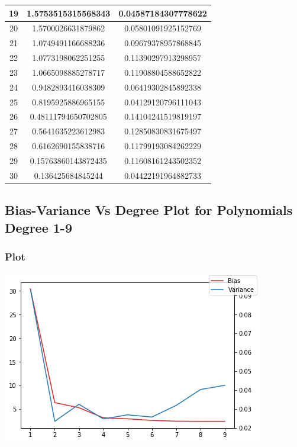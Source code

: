 \documentclass{article}
\begin{document}
\begin{center}
\begin{tabular}{ | c | c | c | }
\hline
19 & 1.5753515315568343 & 0.04587184307778622 \\ 
\hline
20 & 1.5700026631879862 & 0.05801091925152769 \\ 
\hline
21 & 1.0749491166688236 & 0.09679378957868845 \\ 
\hline
22 & 1.0773198062251255 & 0.11390297913298957 \\ 
\hline
23 & 1.0665098885278717 & 0.11908804588652822 \\ 
\hline
24 & 0.9482893416038309 & 0.06419302845892338 \\ 
\hline
25 & 0.8195925886965155 & 0.04129120796111043 \\
\hline 
26 & 0.48111794650702805 & 0.14104241519819197 \\ 
\hline
27 & 0.5641635223612983 & 0.12850830831675497 \\ 
\hline
28 & 0.6162690155838716 & 0.11799193084262229 \\ 
\hline
29 & 0.15763860143872435 & 0.11608161243502352 \\ 
\hline
30 & 0.136425684845244 & 0.04422191964882733 \\ 
\hline
\end{tabular}
\end{center}

\subsection{Bias-Variance Vs Degree Plot for Polynomials Degree 1-9}
\subsubsection{Plot}
\includegraphics[scale=.9]{images/1-9.png}
\end{document}
